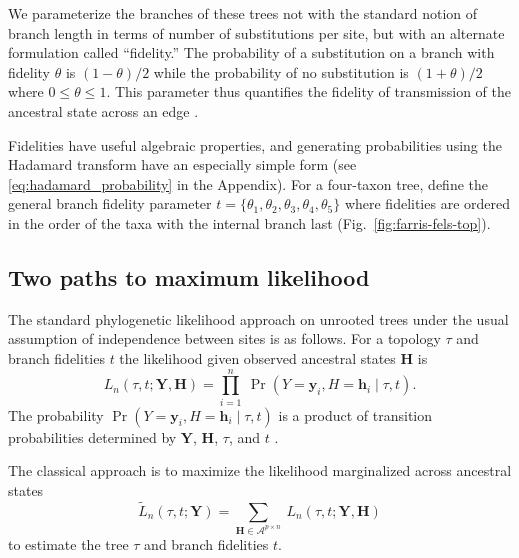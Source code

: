 \documentclass{article}
\newcommand{\alphabet}{\mathcal{A}}
\newcommand{\fullAlignment}{\mathbf{Y}}
\newcommand{\alignmentColumn}{\mathbf{y}}
\newcommand{\alignmentColumnRV}{Y}
\newcommand{\fullAncestralStates}{\mathbf{H}}
\newcommand{\ancestralStateColumn}{\mathbf{h}}
\newcommand{\ancestralStateColumnRV}{H}
\newcommand{\nCols}{n}
\newcommand{\nAncestralStateRows}{p}
\begin{document}
We parameterize the branches of these trees not with the standard notion of branch length in terms of number of substitutions per site, but with an alternate formulation called ``fidelity.''
The probability of a substitution on a branch with fidelity $\theta$ is $(1-\theta)/2$ while the probability of no substitution is $(1+\theta)/2$ where $0 \le \theta \le 1$.
This parameter thus quantifies the fidelity of transmission of the ancestral state across an edge \cite{Matsen2007-jq}.

Fidelities have useful algebraic properties, and generating probabilities using the Hadamard transform have an especially simple form (see \eqref{eq:hadamard_probability} in the Appendix).
For a four-taxon tree, define the general branch fidelity parameter $t=\{\theta_1,\theta_2,\theta_3,\theta_4,\theta_5\}$ where fidelities are ordered in the order of the taxa with the internal branch last (Fig.~\ref{fig:farris-fels-top}).

\subsection*{Two paths to maximum likelihood}

The standard phylogenetic likelihood approach on unrooted trees under the usual assumption of independence between sites is as follows.
For a topology $\tau$ and branch fidelities $t$ the likelihood given observed ancestral states $\fullAncestralStates$ is
\begin{equation}
\label{eq:full_likelihood}
L_\nCols(\tau, t; \fullAlignment,\fullAncestralStates) = \prod_{i=1}^{\nCols} \ \Pr(\alignmentColumnRV=\alignmentColumn_i, \ancestralStateColumnRV=\ancestralStateColumn_i \mid \tau, t).
\end{equation}
The probability $\Pr(\alignmentColumnRV=\alignmentColumn_i, \ancestralStateColumnRV=\ancestralStateColumn_i \mid \tau, t)$ is a product of transition probabilities determined by $\fullAlignment$, $\fullAncestralStates$, $\tau$, and $t$ \cite{Felsenstein2004}.

The classical approach is to maximize the likelihood marginalized across ancestral states
\begin{equation}
\label{eq:marginal_likelihood}
\tilde{L}_\nCols(\tau, t; \fullAlignment) = \sum_{\fullAncestralStates\in\alphabet^{\nAncestralStateRows\times\nCols}} \ L_\nCols(\tau, t; \fullAlignment, \fullAncestralStates)
\end{equation}
to estimate the tree $\tau$ and branch fidelities $t$.
\end{document}

